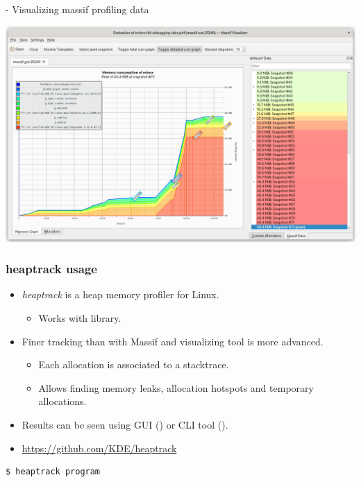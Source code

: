 \begin{frame}{ - Visualizing massif profiling data}
  \begin{center}
    \includegraphics[height=0.8\textheight]{slides/debugging-application-profiling/massif_visualizer.png}
  \end{center}
\end{frame}

\begin{frame}[fragile]
  \frametitle{heaptrack usage}
  \begin{itemize}
    \item {\em heaptrack} is a heap memory profiler for Linux.
    \begin{itemize}
      \item Works with  library.
    \end{itemize}
    \item Finer tracking than with Massif and visualizing tool is more advanced.
    \begin{itemize}
      \item Each allocation is associated to a stacktrace.
      \item Allows finding memory leaks, allocation hotspots and
            temporary allocations.
    \end{itemize}
    \item Results can be seen using GUI () or CLI tool
          ().
    \item \url{https://github.com/KDE/heaptrack}
  \end{itemize}
  \begin{block}{}
    \begin{verbatim}
$ heaptrack program
    \end{verbatim}
  \end{block}
\end{frame}

